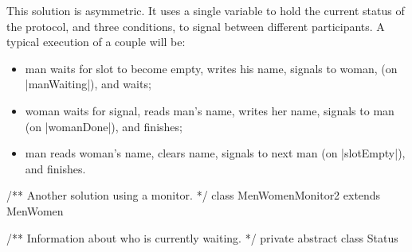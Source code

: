\begin{answer}





This solution is asymmetric.  It uses a single variable to
hold the current status of the protocol, and three conditions, to signal
between different participants.  A typical execution of a couple will be:
\begin{itemize}
\item man waits for slot to become empty, writes his name, signals to woman,
(on |manWaiting|), and waits;

\item woman waits for signal, reads man's name, writes her name, signals to
man (on |womanDone|), and finishes;

\item man reads woman's name, clears name, signals to next man (on
|slotEmpty|), and finishes.
\end{itemize}
%
\begin{scala}
/** Another solution using a monitor. */
class MenWomenMonitor2 extends MenWomen{
  /** Information about who is currently waiting. */
  private abstract class Status

}
\end{scala}
\end{answer}
